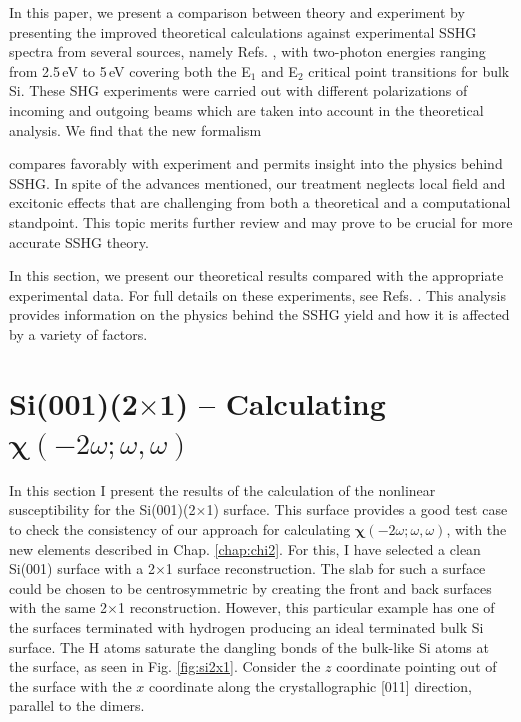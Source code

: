 In this paper, we present a comparison between theory and experiment by presenting the improved theoretical calculations against experimental SSHG spectra from several sources, namely Refs. \cite{hoferAPA96, bergfeldPRL04, mejiaPRB02, mitchellSS01}, with two-photon energies ranging from 2.5\,eV to 5\,eV covering both the E$_{1}$ and E$_{2}$ critical point transitions for bulk Si. These SHG experiments were carried out with different polarizations of incoming and outgoing beams which are taken into account in the theoretical analysis. We find that the new formalism {compares favorably with experiment and permits insight into the physics behind SSHG. In spite of the advances mentioned, our treatment neglects local field and excitonic effects that are challenging from both a theoretical and a computational standpoint. This topic merits further review and may prove to be crucial for more accurate SSHG theory.

In this section, we present our theoretical results compared with the appropriate experimental data. For full details on these experiments, see Refs. \cite{hoferAPA96, mitchellSS01, mejiaPRB02, bergfeldPRL04}. This analysis provides information on the physics behind the SSHG yield and how it is affected by a variety of factors.



\section{\texorpdfstring{Si(001)(2$\times$1)}{Si(001)(2x1)} -- Calculating
\texorpdfstring{$\boldsymbol{\chi}(-2\omega;\omega,\omega)$}{X(-2w;w,w)}}
\label{sec:res2x1chi}

In this section I present the results of the calculation of the nonlinear
susceptibility for the Si(001)(2$\times$1) surface. This surface provides a good
test case to check the consistency of our approach for calculating
$\boldsymbol{\chi}(-2\omega;\omega,\omega)$, with the new elements described in
Chap. \ref{chap:chi2}. For this, I have selected a clean Si(001) surface with a
2$\times$1 surface reconstruction. The slab for such a surface could be chosen
to be centrosymmetric by creating the front and back surfaces with the same
2$\times$1 reconstruction. However, this particular example has one of the
surfaces terminated with hydrogen producing an ideal terminated bulk Si surface.
The H atoms saturate the dangling bonds of the bulk-like Si atoms at the
surface, as seen in Fig. \ref{fig:si2x1}. Consider the $z$ coordinate pointing
out of the surface with the $x$ coordinate along the crystallographic [011]
direction, parallel to the dimers.

}
